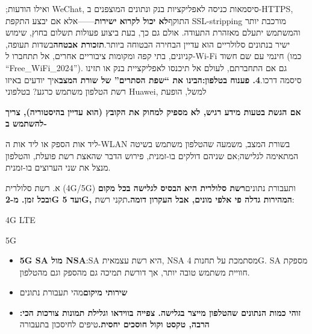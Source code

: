 
;ואילו הודעות WeChat, סיסמאות כניסה לאפליקציות בנק ונתונים המוצפנים ב-HTTPS, התוקף\textbf{לא יכול לקרוא ישירות}——אלא אם יבצע התקפת SSL-stripping מורכבת יותר והמשתמש יתעלם מאזהרת התעודה. אולם גם כך, בעת ביצוע פעולות תשלום בחוץ, שימוש ישיר בנתונים סלולריים הוא עדיין הבחירה הבטוחה ביותר.\textbf{תזכורת אבטחה}בשדות תעופה, קניונים, בתי קפה ומקומות ציבוריים אחרים, אל תתחברו ל-Wi-Fi חינמי עם שם חשוד (כמו “Free\_WiFi\_2024”). גם אם התחברתם, לעולם אל תיכנסו לאפליקציית בנק או תזינו סיסמה דרכו.\textbf{4. פענוח בטלפון:הבינו את “שפת הסתרים” של שורת המצב}איך יודעים באיזו רשת הטלפון משתמש כרגע? בטלפוני Huawei, למשל, הופעת

\textbf{אם הגשת בטעות מידע רגיש, לא מספיק למחוק את הקובץ (הוא עדיין בהיסטוריה), צריך להשתמש ב-}\par

ליד אות הספק או ליד אות ה-WLAN בשורת המצב, משמעה שהטלפון משתמש בשיטה המתאימה לגלישה;אם שניהם דולקים בו-זמנית, פירוש הדבר שהאצת רשת פועלת, והטלפון מנצל את שני הערוצים בו-זמנית.


א. רשת סלולרית (4G/5G) ותעבורת נתונים\textbf{רשת סלולרית היא הבסיס לגלישה בכל מקום ובכל זמן. מ-2G ועד 5G, המהירות גדלה פי אלפי מונים, אבל העקרון דומה.}תקני רשת:

4G LTE


5G


\begin{itemize}
  \item \textbf{5G SA מול NSA}:SA היא רשת עצמאית, NSA מסתמכת על תחנות 4G. SA מספקת חוויית משתמש טובה יותר, אך דורשת תמיכה גם מהספק וגם מהטלפון.
  \item \textbf{שירותי מיקום}מהי תעבורת נתונים
  \item \textbf{:זוהי כמות הנתונים שהטלפון מייצר בגלישה. צפייה בווידאו וגלילת תמונות צורכות הכי הרבה, טקסט וקול חוסכים יחסית.}טיפים לחיסכון בתעבורה
\end{itemize}

